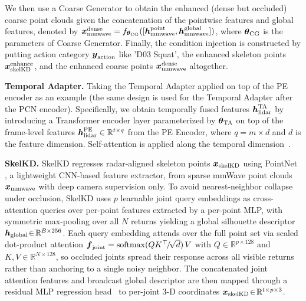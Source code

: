 \documentclass{article}
\begin{document}
We then use a Coarse Generator \cite{kipf2016semi} to obtain the enhanced (dense but occluded) coarse point clouds given the concatenation of the pointwise features and global features, denoted by $\boldsymbol{x}_{\rm{mmwave}}^{\rm{dense}}=f_{\boldsymbol{\theta}_{\rm{CG}}}([\boldsymbol{h}_{\rm{mmwave}}^{\rm{point}}, \boldsymbol{h}_{\rm{mmwave}}^{\rm{global}}])$, where $\boldsymbol{\theta}_{\rm{CG}}$ is the parameters of Coarse Generator. 
Finally, the condition injection is constructed by putting action category $\boldsymbol{y}_{\rm{action}}$ like 'D03 Squat', the enhanced skeleton points $\boldsymbol{x}_{\rm{skelKD}}^{\rm{enhance}}$, and the enhanced coarse points $\boldsymbol{x}_{\rm{mmwave}}^{\rm{dense}}$ altogether.

\textbf{Temporal Adapter.}
Taking the Temporal Adapter applied on top of the PE encoder as an example (the same design is used for the Temporal Adapter after the PCN encoder). Specifically, we obtain temporally fused features $\boldsymbol{h}_{\rm{lidar}}^{\rm{TA}}$ by introducing a Transformer encoder layer parameterized by $\boldsymbol{\theta}_{\rm{TA}}$ on top of the frame-level features $\boldsymbol{h}_{\rm{lidar}}^{\rm{PE}} \in \mathbb{R}^{t \times q}$ from the PE Encoder, where $q = m \times d$ and $d$ is the feature dimension. Self-attention is applied along the temporal dimension~\cite{vaswani2017attention}.

\textbf{SkelKD.}
SkelKD regresses radar-aligned skeleton points $\boldsymbol{x}_{\rm{skelKD}}$ using PointNet \cite{qi2017pointnet}, a lightweight CNN-based feature extractor, from sparse mmWave point clouds $\boldsymbol{x}_{\rm{mmwave}}$ with deep camera supervision only. To avoid nearest-neighbor collapse under occlusion, SkelKD uses $p$ learnable joint query embeddings as cross-attention queries over per-point features extracted by a per-point MLP, with symmetric max-pooling over all $N$ returns yielding a global silhouette descriptor $\boldsymbol{h}_{\rm{global}}\!\in\!\mathbb{R}^{B\times256}$. Each query embedding attends over the full point set via scaled dot-product attention $\boldsymbol{f}_{\rm{joint}} = \mathrm{softmax}(QK^\top\!/\!\sqrt{d})\,V$ with $Q\!\in\!\mathbb{R}^{p\times128}$ and $K,V\!\in\!\mathbb{R}^{N\times128}$, so occluded joints spread their response across all visible returns rather than anchoring to a single noisy neighbor. The concatenated joint attention features and broadcast global descriptor are then mapped through a residual MLP regression head~\cite{he2016deep} to per-joint 3-D coordinates $\boldsymbol{x}_{\rm{skelKD}}\!\in\!\mathbb{R}^{t\times p\times3}$. 
\end{document}
